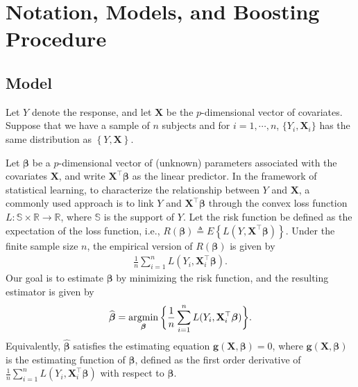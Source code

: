 \section{Notation, Models, and Boosting Procedure} \label{notation}


\subsection{Model} \label{Def: Data}


Let $Y$ denote the response, and let $\mathbf{X}$ be the $p$-dimensional vector of covariates. Suppose that we have a sample of $n$ subjects and for $i=1, \cdots, n$, $\{Y_i, \mathbf{X}_i\}$ has the same distribution as $\left\{ Y, \mathbf{X} \right\}$.


Let $\boldsymbol{\beta}$ be a $p$-dimensional vector of (unknown) parameters associated with the covariates $\mathbf{X}$, and write $\mathbf{X}^\top \boldsymbol{\beta}$ as the linear predictor. In the framework of statistical learning, to characterize the relationship between $Y$ and $\mathbf{X}$, a commonly used approach is to link $Y$ and $\mathbf{X}^\top \boldsymbol{\beta}$ through the convex loss function $L: \mathbb{S} \times \mathbb{R} \rightarrow \mathbb{R}$, where $\mathbb{S}$ is the support of $Y$. Let the risk function be defined as the expectation of the loss function, i.e., $R(\boldsymbol{\beta}) \triangleq E\left\{ L(Y, \mathbf{X}^\top \boldsymbol{\beta}) \right\}$. Under the finite sample size $n$, the empirical version of $R(\boldsymbol{\beta})$ is given by
\begin{eqnarray*}
\frac{1}{n} \sum \limits_{i=1}^n L(Y_i, \mathbf{X}_i^\top \boldsymbol{\beta} ).
\end{eqnarray*}
Our goal is to estimate $\boldsymbol{\beta}$ by minimizing the risk function, and the resulting estimator is given by
\begin{eqnarray*}
\widehat{\boldsymbol{\beta}} = \argmin \limits_{\boldsymbol{\beta}} \bigg\{ \frac{1}{n} \sum \limits_{i=1}^n L(Y_i, \mathbf{X}_i^\top \boldsymbol{\beta} ) \bigg\}.
\end{eqnarray*}
Equivalently, $\widehat{\boldsymbol{\beta}}$ satisfies the estimating equation $\mathbf{g}(\mathbf{X},\boldsymbol{\beta}) = 0$, where $\mathbf{g}(\mathbf{X},\boldsymbol{\beta})$ is the estimating function of $\boldsymbol{\beta}$, defined as the first order derivative of $\frac{1}{n} \sum \limits_{i=1}^n L(Y_i, \mathbf{X}_i^\top \boldsymbol{\beta} )$ with respect to $\boldsymbol{\beta}$.


